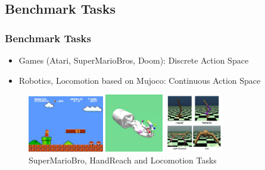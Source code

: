 \documentclass[10pt,hyperref={CJKbookmarks=true},envcountsect,mathserif]{beamer}
\begin{document}
\subsection{Benchmark Tasks}
\begin{frame}
\frametitle{Benchmark Tasks}	
\begin{itemize}
	\item Games (Atari, SuperMarioBros, Doom): Discrete Action Space
	\item Robotics, Locomotion based on Mujoco: Continuous Action Space
\end{itemize}
\begin{figure}
\centering
\begin{minipage}[t]{0.33\linewidth}
			\centering
			\includegraphics[width=1.3in]{figures/mariobro.jpeg}
		\end{minipage}%
		\begin{minipage}[t]{0.33\linewidth}
			\centering
			\includegraphics[width=1.0in]{figures/handreach.jpg}
		\end{minipage}%
		\begin{minipage}[t]{0.33\linewidth}
			\centering
			\includegraphics[width=1.0in]{figures/locomotion.png}
		\end{minipage}%
\caption{SuperMarioBro, HandReach and Locomotion Tasks}
\end{figure}

\end{frame}
\end{document}
